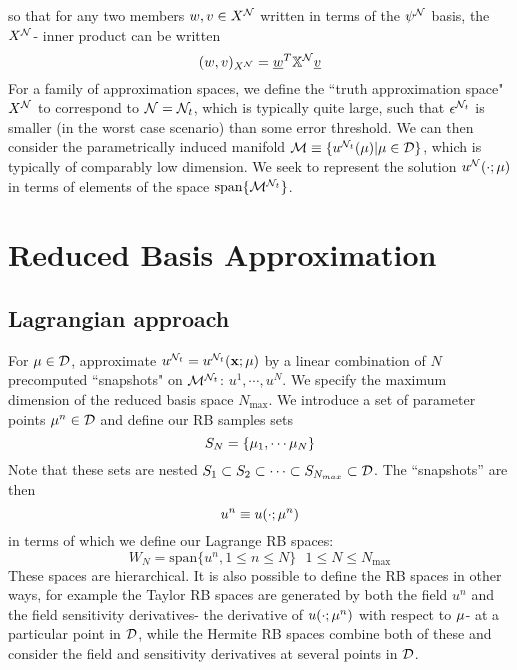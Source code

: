 so that for any two members $w,v \in X^{\mathcal{N}}$ written in terms of the $\psi^{\mathcal{N}}$ basis, the $X^{\mathcal{N}}$- inner product can be written
\begin{equation}
(w,v)_{X^{\mathcal{N}}}=\underline{w}^T\mathbb{X}^{\mathcal{N}}\underline{v}
\end{equation}
For a family of approximation spaces, we define the ``truth approximation space" $X^{\mathcal{N}}$ to correspond to $\mathcal{N}=\mathcal{N}_t$, which is typically quite large, such that $\epsilon^{\mathcal{N}_t}$ is smaller (in the worst case scenario) than some error threshold. We can then consider the parametrically induced manifold $\mathcal{M} \equiv \{ u^{\mathcal{N}_t}({\mathbf{\mu}}) | {\mathbf{\mu}} \in \mathcal{D} \}$, which is typically of comparably low dimension. We seek to represent the solution $u^{\mathcal{N}}(\cdot; {\mathbf{\mu}})$ in terms of elements of the space $\mbox{span}\{\mathcal{M}^{\mathcal{N}_t}\}$.

\section{Reduced Basis Approximation}
\subsection{Lagrangian approach}
For ${\mathbf{\mu}}\in \mathcal{D} $, approximate $u^{\mathcal{N}_t}=u^{\mathcal{N}_t}({\mathbf{x}};{\mathbf{\mu}})$ by a linear combination of $N$ precomputed ``snapshots" on $\mathcal{M}^{\mathcal{N}_t}$: $u^1, \cdots, u^N$. We specify the maximum dimension of the reduced basis space $N_{\mbox{max}}$. We introduce a set of parameter points ${\mathbf{\mu}}^n \in \mathcal{D}$ and define our RB samples sets
\begin{equation}
S_N = \{{\mathbf{\mu}}_1, \cdots {\mathbf{\mu}}_N\}
\end{equation} 
Note that these sets are nested $S_1 \subset S_2 \subset \cdots \subset S_{N_{max}}\subset \mathcal{D}$. The ``snapshots'' are then 
\begin{equation}
u^n \equiv u(\cdot;{\mathbf{\mu}}^n)
\end{equation}
in terms of which we define our Lagrange RB spaces:
\begin{equation}
W_N = \mbox{span}\{u^n, 1 \leq n \leq N \} \mbox{  } 1 \leq N \leq N_{\mbox{max}}
\end{equation}
These spaces are hierarchical. It is also possible to define the RB spaces in other ways, for example the Taylor RB spaces are generated by both the field $u^n$ and the field sensitivity derivatives- the derivative of $u(\cdot;{\mathbf{\mu}}^n)$ with respect to ${\mathbf{\mu}}$- at a particular point in $\mathcal{D}$, while the Hermite RB spaces combine both of these and consider the field and sensitivity derivatives at several points in $\mathcal{D}$. 

